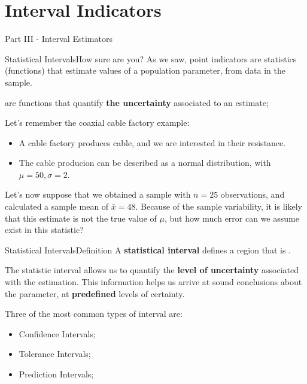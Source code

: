 \section{Interval Indicators}
\begin{frame}
  \begin{center}
    Part III - Interval Estimators
  \end{center}
\end{frame}

\begin{frame}{Statistical Intervals}{How sure are you?}
As we saw, point indicators are statistics (functions) that estimate values of a population parameter, from data in the sample.\bigskip

 are functions that quantify {\bf the uncertainty} associated to an estimate;
\bigskip

Let's remember the coaxial cable factory example:
\begin{itemize}
  \item A cable factory produces cable, and we are interested in their resistance.
  \item The cable producion can be described as a normal distribution, with $\mu = 50, \sigma = 2$.
\end{itemize}\bigskip

Let's now suppose that we obtained a sample with $n=25$ observations, and calculated a sample mean of $\bar{x} = 48$. Because of the sample variability, it is likely that this estimate is not the true value of $\mu$, but how much error can we assume exist in this statistic?
\end{frame}

\begin{frame}{Statistical Intervals}{Definition}
A {\bf statistical interval} defines a region that is .
\bigskip

The statistic interval allows us to quantify the {\bf level of uncertainty} associated with the estimation. This information helps us arrive at sound conclusions about the parameter, at {\bf predefined} levels of certainty.
\bigskip

Three of the most common types of interval are:

\begin{itemize}
  \item Confidence Intervals;
  \item Tolerance Intervals;
  \item Prediction Intervals;
\end{itemize}
\end{frame}


